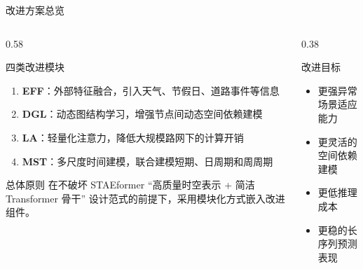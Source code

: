 \documentclass[10pt,aspectratio=169]{ctexbeamer}
\begin{document}
\begin{frame}{改进方案总览}
  \begin{columns}[T]
    \begin{column}{0.58\textwidth}
      \begin{block}{四类改进模块}
        \begin{enumerate}\setlength{\itemsep}{3pt}
          \item \textbf{EFF}：外部特征融合，引入天气、节假日、道路事件等信息
          \item \textbf{DGL}：动态图结构学习，增强节点间动态空间依赖建模
          \item \textbf{LA}：轻量化注意力，降低大规模路网下的计算开销
          \item \textbf{MST}：多尺度时间建模，联合建模短期、日周期和周周期
        \end{enumerate}
      \end{block}

      \begin{exampleblock}{总体原则}
        在不破坏 STAEformer “高质量时空表示 + 简洁 Transformer 骨干” 设计范式的前提下，采用模块化方式嵌入改进组件。
      \end{exampleblock}
    \end{column}
    \begin{column}{0.38\textwidth}
      \begin{alertblock}{改进目标}
        \begin{itemize}\setlength{\itemsep}{2pt}
          \item 更强异常场景适应能力
          \item 更灵活的空间依赖建模
          \item 更低推理成本
          \item 更稳的长序列预测表现
        \end{itemize}
      \end{alertblock}
    \end{column}
  \end{columns}
\end{frame}
\end{document}
